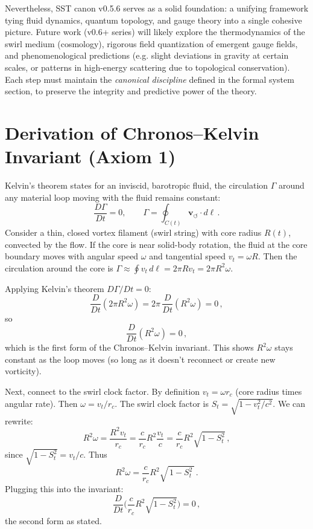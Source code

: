 \documentclass[aps,onecolumn,10pt,nofootinbib]{revtex4}
\newcommand{\swirlarrow}{\circlearrowleft} %
\newcommand{\vswirl}{\mathbf{v}_{\!\swirlarrow}}     %
\begin{document}
	Nevertheless, SST canon v0.5.6 serves as a solid foundation: a unifying framework tying fluid dynamics, quantum topology, and gauge theory into a single cohesive picture. Future work (v0.6+ series) will likely explore the thermodynamics of the swirl medium (cosmology), rigorous field quantization of emergent gauge fields, and phenomenological predictions (e.g. slight deviations in gravity at certain scales, or patterns in high-energy scattering due to topological conservation). Each step must maintain the \emph{canonical discipline} defined in the formal system section, to preserve the integrity and predictive power of the theory.


	\appendix
	\section{Derivation of Chronos–Kelvin Invariant (Axiom 1)}
	Kelvin’s theorem states for an inviscid, barotropic fluid, the circulation $\Gamma$ around any material loop moving with the fluid remains constant:
	\[
		\frac{D\Gamma}{Dt} = 0, \qquad \Gamma = \oint_{C(t)} \vswirl \cdot d\ell\,.
	\]
	Consider a thin, closed vortex filament (swirl string) with core radius $R(t)$, convected by the flow. If the core is near solid-body rotation, the fluid at the core boundary moves with angular speed $\omega$ and tangential speed $v_t = \omega R$. Then the circulation around the core is $\Gamma \approx \oint v_t\,d\ell = 2\pi R v_t = 2\pi R^2 \omega$.

	Applying Kelvin’s theorem $D\Gamma/Dt=0$:
	\[
		\frac{D}{Dt}(2\pi R^2 \omega) = 2\pi\,\frac{D}{Dt}(R^2 \omega) = 0\,,
	\]
	so
	\[
		\frac{D}{Dt}(R^2 \omega) = 0\,,
	\]
	which is the first form of the Chronos–Kelvin invariant. This shows $R^2 \omega$ stays constant as the loop moves (so long as it doesn’t reconnect or create new vorticity).

	Next, connect to the swirl clock factor. By definition $v_t = \omega r_c$ (core radius times angular rate). Then $\omega = v_t/r_c$. The swirl clock factor is $S_t = \sqrt{1 - v_t^2/c^2}$. We can rewrite:
	\[
		R^2 \omega = \frac{R^2 v_t}{r_c} = \frac{c}{r_c} R^2 \frac{v_t}{c} = \frac{c}{r_c} R^2 \sqrt{1 - S_t^2}\,,
	\]
	since $\sqrt{1 - S_t^2} = v_t/c$. Thus
	\[
		R^2 \omega = \frac{c}{r_c} R^2 \sqrt{\,1 - S_t^2\,}\,.
	\]
	Plugging this into the invariant:
	\[
		\frac{D}{Dt}\Big(\frac{c}{r_c} R^2 \sqrt{1 - S_t^2}\Big) = 0\,,
	\]
	the second form as stated.
\end{document}
